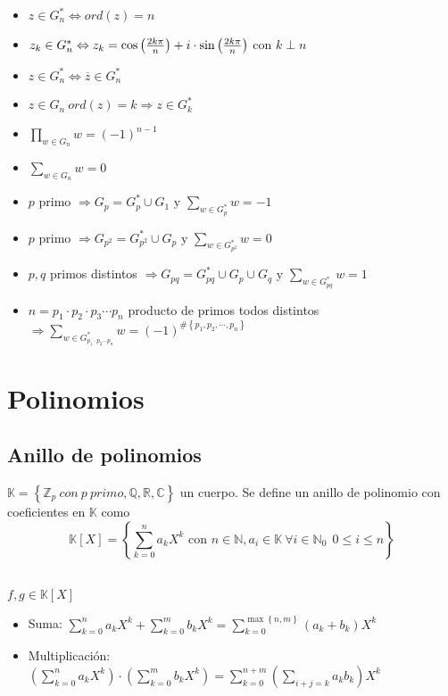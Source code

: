 \documentclass[a4paper,10pt]{article}
\begin{document}
\propiedades 
\begin{itemize}
	\item $z \in G_{n}^{*} \Leftrightarrow ord(z)=n$
	\item $z_k \in G_{n}^{*} \Leftrightarrow z_k = \cos \left( \frac{2k\pi}{n} \right) + i \cdot \sin \left( \frac{2k\pi}{n} \right)$ con $k \perp n$
	\item $z \in G_{n}^{*} \Leftrightarrow \overline{z} \in G_{n}^{*}$
	\item $z \in G_{n} \ ord(z)=k \Rightarrow z \in G_k^{*}$
	\item $\displaystyle \prod_{w \in G_{n}} {w} = (-1)^{n-1}$
	\item $\displaystyle \sum_{w \in G_{n}} {w} = 0$ 
	\item $p$ primo $\Rightarrow G_p = G_{p}^{*} \cup G_1 \mbox{ y } \displaystyle \sum_{w \in G_{p}^{*}} {w} = -1$
	\item $p$ primo $\Rightarrow G_{p^{2}} = G_{{p}^{2}}^{*} \cup G_{p} \mbox{ y } \displaystyle \sum_{w \in G_{{p}^{2}}^{*}} {w} = 0$
	\item $p,q$ primos distintos $\Rightarrow G_{pq} = G_{pq}^{*} \cup G_{p} \cup G_{q} \mbox{ y } \displaystyle \sum_{w \in G_{pq}^{*}} {w} = 1$
	\item $n=p_1 \cdot p_2 \cdot p_3 \cdots p_n$ producto de primos todos distintos $\Rightarrow \displaystyle \sum_{w \in G_{p_1 \cdot p_2 \cdots p_n}^{*}} {w} = (-1)^{\#\left\lbrace p_1,p_2, \cdots,p_n \right\rbrace}$ 
	
\end{itemize}

\section{Polinomios}

\subsection{Anillo de polinomios}


 $\mathbb{K} = \left\lbrace \mathbb{Z}_p \ con \ p \ primo,\mathbb{Q},\mathbb{R},\mathbb{C} \right\rbrace$ un cuerpo. Se define un anillo de polinomio con coeficientes en $\mathbb{K}$ como
$$\mathbb{K}[X] = \left\lbrace \sum_{k=0}^{n} {a_k{X^{k}}} \mbox{ con } n \in \mathbb{N}, a_i \in \mathbb{K} \ \forall i \in \mathbb{N}_0 \ \ 0 \leq i \leq n \right\rbrace$$

 \\
$f,g \in \mathbb{K}[X]$
\begin{itemize}
	\item Suma: $\displaystyle \sum_{k=0}^{n} {a_k{X^{k}}} + \sum_{k=0}^{m} {b_k{X^{k}}} = \sum_{k=0}^{\max \left\lbrace n,m \right\rbrace} {(a_k+b_k)X^{k}} $
	\item Multiplicación: $\displaystyle \left( \sum_{k=0}^{n} {a_k{X^{k}}} \right) \cdot \left( \sum_{k=0}^{m} {b_k{X^{k}}} \right) = \sum_{k=0}^{n+m} {\left( {\sum_{i+j=k} {a_k b_k}} \right) X^{k}} $
\end{itemize}
\end{document}
